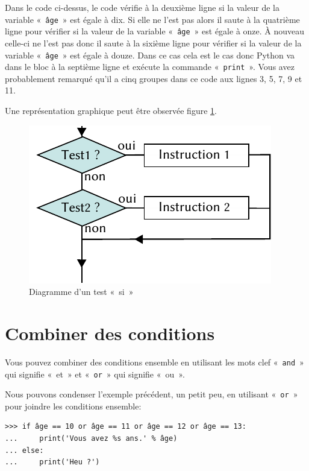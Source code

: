 Dans le code ci-dessus, le code vérifie à la deuxième ligne si la valeur de la variable « \texttt{âge} » est égale à dix.
Si elle ne l'est pas alors il saute à la quatrième ligne pour vérifier si 
la valeur de la variable « \texttt{âge} » est égale à onze. À nouveau  celle-ci     ne l'est pas donc il saute à la sixième ligne  pour vérifier si 
la valeur de la variable « \texttt{âge} » est égale à douze. Dans ce cas cela est le cas donc Python va dans le bloc à la septième ligne et exécute la commande « \texttt{print} ».
Vous avez probablement remarqué qu'il a cinq groupes dans ce code aux lignes 3, 5, 7, 9 et 11.

Une représentation graphique peut être observée figure \ref{fig:Cf-elif-fr}.

\begin{figure}[ht]
\centering
\includegraphics[scale=1.5]{images/Cf-elif-fr.pdf}
\caption{Diagramme d'un test « si »}
\label{fig:Cf-elif-fr}
\end{figure}

\section{Combiner des conditions}
Vous pouvez combiner des conditions ensemble en utilisant les mots clef « \texttt{and} » qui signifie « et » et « \texttt{or} » qui signifie « ou ».

Nous pouvons condenser l'exemple précédent, un petit peu, en utilisant « \texttt{or} » pour joindre les conditions ensemble:

\begin{Verbatim}[frame=single,rulecolor=\color{green}, label=à taper avec attention]
>>> if âge == 10 or âge == 11 or âge == 12 or âge == 13:
...     print('Vous avez %s ans.' % âge)
... else:
...     print('Heu ?')
\end{Verbatim}

